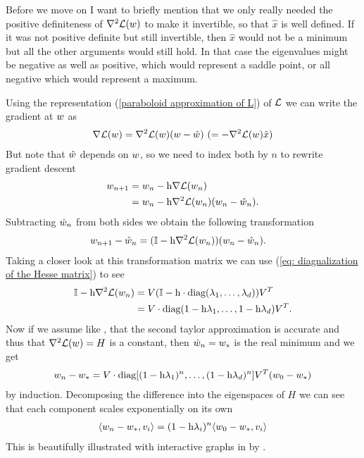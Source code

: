 Before we move on I want to briefly mention that we only really needed the
positive definiteness of \(\nabla^2 \mathcal{L}(w)\) to make it invertible, so that
\(\hat{x}\) is well defined. If it was not positive definite but still invertible,
then \(\hat{x}\) would not be a minimum but all the other arguments would still
hold.
In that case the eigenvalues might be negative as well as positive, which would
represent a saddle point, or all negative which would represent a maximum.

Using the representation (\ref{paraboloid approximation of L}) of \(\mathcal{L}\) we
can write the gradient at \(w\) as
%
\begin{align}\label{eq: hesse representation of gradient}
	\nabla \mathcal{L}(w)
	=  \nabla^2 \mathcal{L}(w)(w-\hat{w})
	\ (= -\nabla^2 \mathcal{L}(w)\hat{x})
\end{align}
%
But note that \(\hat{w}\) depends on \(w\), so we need to index both
by \(n\) to rewrite gradient descent
%
\begin{align*}
	w_{n+1} &= w_n - \text{h}\nabla \mathcal{L}(w_n)\\
	&= w_n - \text{h}\nabla^2 \mathcal{L}(w_n)(w_n - \hat{w}_n).
\end{align*}
%
Subtracting \(\hat{w}_n\) from both sides we obtain the following
transformation 
%
\begin{align}\label{eq: Matrix GD Formulation}
	w_{n+1} - \hat{w}_n
	&= (\mathbb{I} - \text{h}\nabla^2 \mathcal{L}(w_n) ) (w_n - \hat{w}_n).
\end{align}
%
Taking a closer look at this transformation matrix we can use (\ref{eq:
diagnalization of the Hesse matrix}) to see
%
\begin{align*}
	\mathbb{I} - \text{h}\nabla^2 \mathcal{L}(w_n)
	&= V(\mathbb{I} - \text{h}\cdot\text{diag}(\lambda_1,\dots,\lambda_d) )V^T \\
	&= V\cdot\text{diag}(1-\text{h}\lambda_1, \dots,1-\text{h}\lambda_d)V^T.
\end{align*}
%
Now if we assume like \textcite{gohWhyMomentumReally2017}, that the second
taylor approximation is accurate and thus that \(\nabla^2 \mathcal{L}(w)=H\) is a
constant, then \(\hat{w}_n = w_*\) is the real minimum and we get
%
\begin{align}
	w_n - w_*
	= V\cdot\text{diag}[(1-\text{h}\lambda_1)^n,\dots,(1-\text{h}\lambda_d)^n] V^T (w_0 - w_*)
\end{align}
%
by induction. Decomposing the difference into the eigenspaces of \(H\) we can 
see that each component scales exponentially on its own 
%
\begin{align*}
	\langle w_n -w_*, v_i\rangle
	= (1-\text{h}\lambda_i)^n \langle w_0 - w_*, v_i\rangle
\end{align*}
%
This is beautifully illustrated with interactive graphs in
 by \citeauthor{gohWhyMomentumReally2017}.

